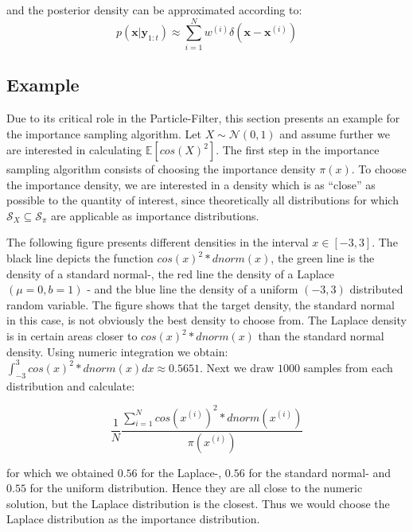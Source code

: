\documentclass[
]{article}
\begin{document}
and the posterior density can be approximated according to: \[
\begin{equation*}
    p(\textbf{x}|\textbf{y}_{1:t}) \approx \sum_{i=1}^N w^{(i)}\delta(\textbf{x} - \textbf{x}^{(i)})
\end{equation*}
\]

\hypertarget{example}{%
\subsection{Example}\label{example}}

Due to its critical role in the Particle-Filter, this section presents
an example for the importance sampling algorithm. Let
\(X \sim \mathcal{N}(0,1)\) and assume further we are interested in
calculating \(\mathbb{E}[cos(X)^2]\). The first step in the importance
sampling algorithm consists of choosing the importance density
\(\pi(x)\). To choose the importance density, we are interested in a
density which is as ``close'' as possible to the quantity of interest,
since theoretically all distributions for which
\(\mathcal{S}_X \subseteq \mathcal{S}_{\pi}\) are applicable as
importance distributions.

The following figure presents different densities in the interval
\(x \in [-3,3]\). The black line depicts the function
\(cos(x)^2*dnorm(x)\), the green line is the density of a standard
normal-, the red line the density of a Laplace \((\mu = 0, b=1)\) - and
the blue line the density of a uniform \((-3,3)\) distributed random
variable. The figure shows that the target density, the standard normal
in this case, is not obviously the best density to choose from. The
Laplace density is in certain areas closer to \(cos(x)^2*dnorm(x)\) than
the standard normal density. Using numeric integration we obtain:
\(\int_{-3}^3cos(x)^2*dnorm(x)dx \approx 0.5651\). Next we draw \(1000\)
samples from each distribution and calculate:

\[
\begin{equation*}
    \frac{1}{N} \frac{\sum_{i=1}^N cos(x^{(i)})^2*dnorm(x^{(i)})}{\pi(x^{(i)})} 
\end{equation*}
\]

for which we obtained \(0.56\) for the Laplace-, \(0.56\) for the
standard normal- and \(0.55\) for the uniform distribution. Hence they
are all close to the numeric solution, but the Laplace distribution is
the closest. Thus we would choose the Laplace distribution as the
importance distribution.
\end{document}
